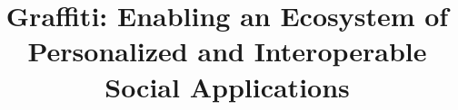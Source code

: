 \documentclass[sigconf,review,anonymous]{acmart}
\title{Graffiti: Enabling an Ecosystem of Personalized and Interoperable Social Applications}
\begin{document}
\begin{abstract}

\end{abstract}
\maketitle











\clearpage
\appendix

\end{document}
